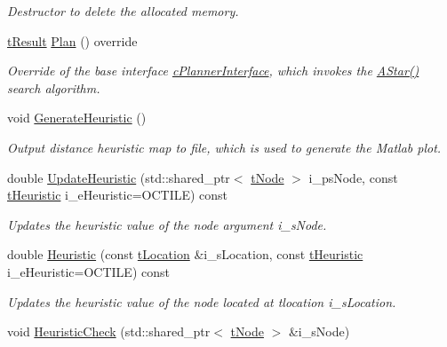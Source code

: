 \begin{DoxyCompactItemize}
\begin{DoxyCompactList}\small\item\em Destructor to delete the allocated memory. \end{DoxyCompactList}\item 
\mbox{\hyperlink{structt_result}{t\+Result}} \mbox{\hyperlink{classplanner_1_1c_planner_a21230c015260b9fc34ad2f239592470e}{Plan}} () override
\begin{DoxyCompactList}\small\item\em Override of the base interface \mbox{\hyperlink{classplanner_1_1c_planner_interface}{c\+Planner\+Interface}}, which invokes the \mbox{\hyperlink{classplanner_1_1c_planner_a341e70531266f023ac9461d18979d1ef}{A\+Star()}} search algorithm. \end{DoxyCompactList}\item 
void \mbox{\hyperlink{classplanner_1_1c_planner_a1a4650050656545744796296a653d388}{Generate\+Heuristic}} ()
\begin{DoxyCompactList}\small\item\em Output distance heuristic map to file, which is used to generate the Matlab plot. \end{DoxyCompactList}\item 
double \mbox{\hyperlink{classplanner_1_1c_planner_ab7cc7c2666de2e49f745901080aac147}{Update\+Heuristic}} (std\+::shared\+\_\+ptr$<$ \mbox{\hyperlink{structplanner_1_1t_node}{t\+Node}} $>$ i\+\_\+ps\+Node, const \mbox{\hyperlink{classplanner_1_1c_planner_a7f6dc4cbb69dd1ede14a67b0a7bd425b}{t\+Heuristic}} i\+\_\+e\+Heuristic=O\+C\+T\+I\+LE) const
\begin{DoxyCompactList}\small\item\em Updates the heuristic value of the node argument i\+\_\+s\+Node. \end{DoxyCompactList}\item 
double \mbox{\hyperlink{classplanner_1_1c_planner_a77cefeae3d7a58a96c74b66f6be22611}{Heuristic}} (const \mbox{\hyperlink{structplanner_1_1t_location}{t\+Location}} \&i\+\_\+s\+Location, const \mbox{\hyperlink{classplanner_1_1c_planner_a7f6dc4cbb69dd1ede14a67b0a7bd425b}{t\+Heuristic}} i\+\_\+e\+Heuristic=O\+C\+T\+I\+LE) const
\begin{DoxyCompactList}\small\item\em Updates the heuristic value of the node located at tlocation i\+\_\+s\+Location. \end{DoxyCompactList}\item 
void \mbox{\hyperlink{classplanner_1_1c_planner_a1234d075676fcaa2c17b859d11b4638c}{Heuristic\+Check}} (std\+::shared\+\_\+ptr$<$ \mbox{\hyperlink{structplanner_1_1t_node}{t\+Node}} $>$ \&i\+\_\+s\+Node)

\end{DoxyCompactItemize}
